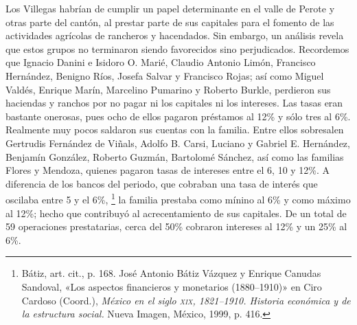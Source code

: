 \documentclass[14pt,twoside,final]{extbook} %
\let\oldfootnote\footnote
\renewcommand\footnote[1]{%
\oldfootnote{\hspace{1mm}#1}}
\begin{document}
Los Villegas habrían de cumplir un papel determinante en el valle de Perote y otras parte del cantón, al prestar parte de sus capitales para el fomento de las actividades agrícolas de rancheros y hacendados. Sin embargo, un análisis revela que estos grupos no terminaron siendo favorecidos sino perjudicados. Recordemos que Ignacio Danini e Isidoro O. Marié, Claudio Antonio Limón, Francisco Hernández, Benigno Ríos, Josefa Salvar y Francisco Rojas; así como Miguel Valdés, Enrique Marín, Marcelino Pumarino y Roberto Burkle, perdieron sus haciendas y ranchos por no pagar ni los capitales ni los intereses. Las tasas eran bastante onerosas, pues ocho de ellos pagaron préstamos al 12\% y sólo tres al 6\%. Realmente muy pocos saldaron sus cuentas con la familia. Entre ellos sobresalen Gertrudis Fernández de Viñals, Adolfo B. Carsi, Luciano y Gabriel E. Hernández, Benjamín González, Roberto Guzmán, Bartolomé Sánchez, así como las familias Flores y Mendoza, quienes pagaron tasas de intereses entre el 6, 10 y 12\%. A diferencia de los bancos del periodo, que cobraban una tasa de interés que oscilaba entre 5 y el 6\%,\footnote{Bátiz, art. cit., p. 168. José Antonio Bátiz Vázquez y Enrique Canudas Sandoval, «Los aspectos financieros y monetarios (1880--1910)» en Ciro Cardoso (Coord.), \emph{México en el siglo \textsc{xix}, 1821--1910. Historia económica y de la estructura social.} Nueva Imagen, México, 1999, p. 416.} la familia prestaba como mínino al 6\% y como máximo al 12\%; hecho que contribuyó al acrecentamiento de sus capitales. De un total de 59 operaciones prestatarias, cerca del 50\% cobraron intereses al 12\% y un 25\% al 6\%.
\end{document}
